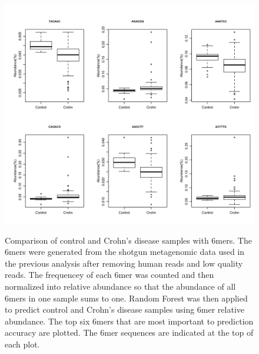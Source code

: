 \begin{figure}[p]
	\centering
	{\includegraphics[scale=0.28,trim=40 0 0 0,clip]{Figure/F55_Kmer_Difference.png}
	}
	\caption[Comparison of control and Crohn's disease samples with 6mers]{Comparison of control and Crohn's disease samples with 6mers. The 6mers were generated from the shotgun metagenomic data used in the previous analysis after removing human reads and low quality reads. The  frequencey of each 6mer was counted and then normalized into relative abundance so that the abundance of all 6mers in one sample sums to one. Random Forest was then applied to predict control and Crohn's disease samples using 6mer relative abundance. The top six 6mers that are most important to prediction accuracy are plotted. The 6mer sequences are indicated at the top of each plot.
	}
	\label{F55_Kmer_Difference}
\end{figure}





